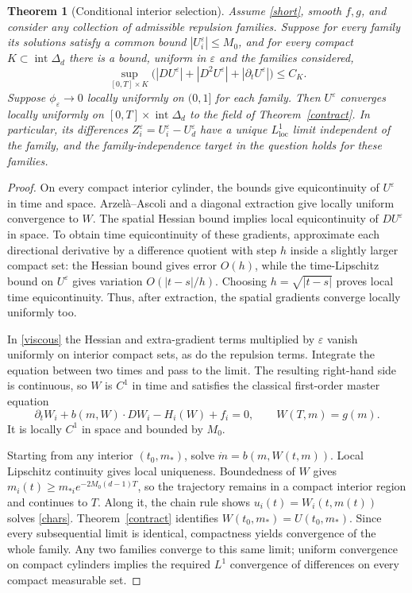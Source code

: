 \documentclass[11pt]{article}
\newtheorem{theorem}{Theorem}
\begin{document}
\begin{theorem}[Conditional interior selection]\label{compact}
Assume \eqref{short}, smooth $f,g$, and consider any collection of admissible repulsion families. Suppose for every family its solutions satisfy a common bound $|U_i^\varepsilon|\le M_0$, and for every compact $K\subset\operatorname{int}\Delta_d$ there is a bound, uniform in $\varepsilon$ and the families considered,
\[
 \sup_{[0,T]\times K}\bigl(|DU^\varepsilon|+|D^2U^\varepsilon|+|\partial_tU^\varepsilon|\bigr)\le C_K.
\]
Suppose $\phi_\varepsilon\to0$ locally uniformly on $(0,1]$ for each family. Then $U^\varepsilon$ converges locally uniformly on $[0,T]\times\operatorname{int}\Delta_d$ to the field of Theorem~\ref{contract}. In particular, its differences $Z_i^\varepsilon=U_i^\varepsilon-U_d^\varepsilon$ have a unique $L^1_{\mathrm{loc}}$ limit independent of the family, and the family-independence target in the question holds for these families.
\end{theorem}
\begin{proof}
On every compact interior cylinder, the bounds give equicontinuity of $U^\varepsilon$ in time and space. Arzel\`a--Ascoli and a diagonal extraction give locally uniform convergence to $W$. The spatial Hessian bound implies local equicontinuity of $DU^\varepsilon$ in space. To obtain time equicontinuity of these gradients, approximate each directional derivative by a difference quotient with step $h$ inside a slightly larger compact set: the Hessian bound gives error $O(h)$, while the time-Lipschitz bound on $U^\varepsilon$ gives variation $O(|t-s|/h)$. Choosing $h=\sqrt{|t-s|}$ proves local time equicontinuity. Thus, after extraction, the spatial gradients converge locally uniformly too.

In \eqref{viscous} the Hessian and extra-gradient terms multiplied by $\varepsilon$ vanish uniformly on interior compact sets, as do the repulsion terms. Integrate the equation between two times and pass to the limit. The resulting right-hand side is continuous, so $W$ is $C^1$ in time and satisfies the classical first-order master equation
\[
 \partial_tW_i+b(m,W)\cdot DW_i-H_i(W)+f_i=0,\qquad W(T,m)=g(m).
\]
It is locally $C^1$ in space and bounded by $M_0$.

Starting from any interior $(t_0,m_*)$, solve $\dot m=b(m,W(t,m))$. Local Lipschitz continuity gives local uniqueness. Boundedness of $W$ gives $m_i(t)\ge m_{*i}e^{-2M_0(d-1)T}$, so the trajectory remains in a compact interior region and continues to $T$. Along it, the chain rule shows $u_i(t)=W_i(t,m(t))$ solves \eqref{chars}. Theorem~\ref{contract} identifies $W(t_0,m_*)=U(t_0,m_*)$. Since every subsequential limit is identical, compactness yields convergence of the whole family. Any two families converge to this same limit; uniform convergence on compact cylinders implies the required $L^1$ convergence of differences on every compact measurable set.
\end{proof}
\end{document}
